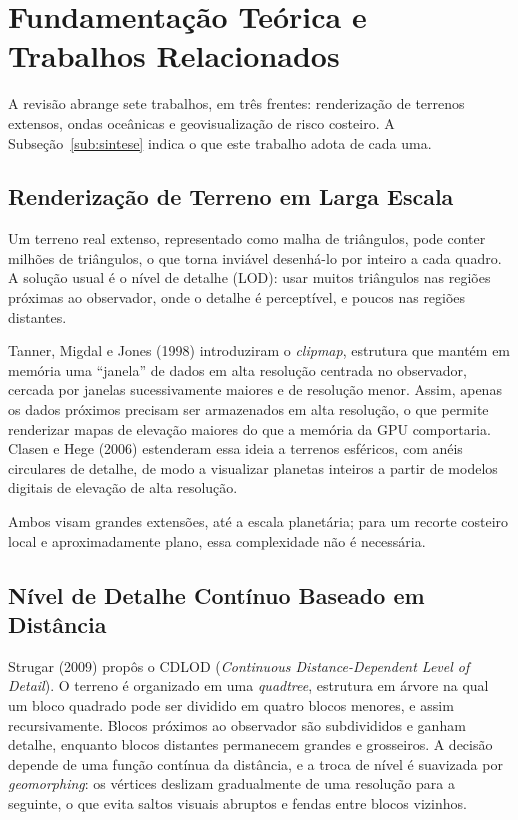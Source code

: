\documentclass[conference]{IEEEtran}
\begin{document}
\section{Fundamentação Teórica e Trabalhos Relacionados}
\label{sec:fund}

A revisão abrange sete trabalhos, em três frentes: renderização de terrenos
extensos, ondas oceânicas e geovisualização de risco costeiro. A
Subseção~\ref{sub:sintese} indica o que este trabalho adota de cada uma.

\subsection{Renderização de Terreno em Larga Escala}
\label{sub:terreno}

Um terreno real extenso, representado como malha de triângulos, pode
conter milhões de triângulos, o que torna inviável desenhá-lo por inteiro a
cada quadro. A solução usual é o nível de detalhe (LOD): usar muitos
triângulos nas regiões próximas ao observador, onde o detalhe é
perceptível, e poucos nas regiões distantes.

Tanner, Migdal e Jones (1998) introduziram o \emph{clipmap}, estrutura que
mantém em memória uma ``janela'' de dados em alta resolução centrada no
observador, cercada por janelas sucessivamente maiores e de resolução
menor. Assim, apenas os dados próximos precisam ser armazenados em alta
resolução, o que permite renderizar mapas de elevação maiores do que a
memória da GPU comportaria. Clasen e Hege (2006) estenderam essa ideia a
terrenos esféricos, com anéis circulares de detalhe, de modo a visualizar
planetas inteiros a partir de modelos digitais de elevação de alta
resolução.

Ambos visam grandes extensões, até a escala planetária; para um recorte
costeiro local e aproximadamente plano, essa complexidade não é necessária.

\subsection{Nível de Detalhe Contínuo Baseado em Distância}
\label{sub:cdlod-rel}

Strugar (2009) propôs o CDLOD (\emph{Continuous Distance-Dependent Level of
Detail}). O terreno é organizado em uma \emph{quadtree}, estrutura em
árvore na qual um bloco quadrado pode ser dividido em quatro blocos
menores, e assim recursivamente. Blocos próximos ao observador são
subdivididos e ganham detalhe, enquanto blocos distantes permanecem grandes
e grosseiros. A decisão depende de uma função contínua da distância, e a
troca de nível é suavizada por \emph{geomorphing}: os vértices deslizam
gradualmente de uma resolução para a seguinte, o que evita saltos visuais
abruptos e fendas entre blocos vizinhos.
\end{document}
